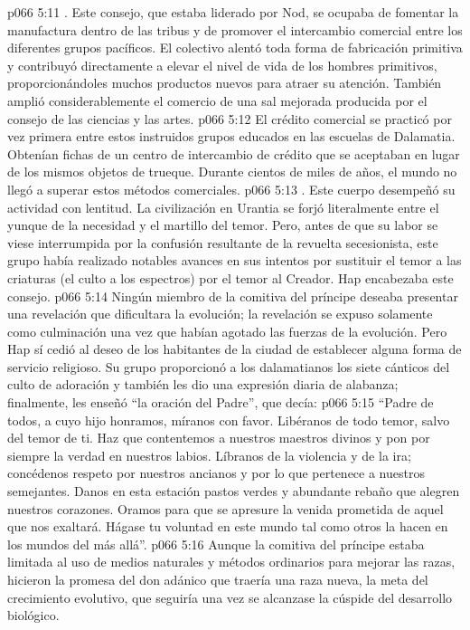 \vs p066 5:11 . Este consejo, que estaba liderado por Nod, se ocupaba de fomentar la manufactura dentro de las tribus y de promover el intercambio comercial entre los diferentes grupos pacíficos. El colectivo alentó toda forma de fabricación primitiva y contribuyó directamente a elevar el nivel de vida de los hombres primitivos, proporcionándoles muchos productos nuevos para atraer su atención. También amplió considerablemente el comercio de una sal mejorada producida por el consejo de las ciencias y las artes.
\vs p066 5:12 El crédito comercial se practicó por vez primera entre estos instruidos grupos educados en las escuelas de Dalamatia. Obtenían fichas de un centro de intercambio de crédito que se aceptaban en lugar de los mismos objetos de trueque. Durante cientos de miles de años, el mundo no llegó a superar estos métodos comerciales.
\vs p066 5:13 \pc {}. Este cuerpo desempeñó su actividad con lentitud. La civilización en Urantia se forjó literalmente entre el yunque de la necesidad y el martillo del temor. Pero, antes de que su labor se viese interrumpida por la confusión resultante de la revuelta secesionista, este grupo había realizado notables avances en sus intentos por sustituir el temor a las criaturas (el culto a los espectros) por el temor al Creador. Hap encabezaba este consejo.
\vs p066 5:14 Ningún miembro de la comitiva del príncipe deseaba presentar una revelación que dificultara la evolución; la revelación se expuso solamente como culminación una vez que habían agotado las fuerzas de la evolución. Pero Hap sí cedió al deseo de los habitantes de la ciudad de establecer alguna forma de servicio religioso. Su grupo proporcionó a los dalamatianos los siete cánticos del culto de adoración y también les dio una expresión diaria de alabanza; finalmente, les enseñó “la oración del Padre”, que decía:
\vs p066 5:15 \pc “Padre de todos, a cuyo hijo honramos, míranos con favor. Libéranos de todo temor, salvo del temor de ti. Haz que contentemos a nuestros maestros divinos y pon por siempre la verdad en nuestros labios. Líbranos de la violencia y de la ira; concédenos respeto por nuestros ancianos y por lo que pertenece a nuestros semejantes. Danos en esta estación pastos verdes y abundante rebaño que alegren nuestros corazones. Oramos para que se apresure la venida prometida de aquel que nos exaltará. Hágase tu voluntad en este mundo tal como otros la hacen en los mundos del más allá”.
\vs p066 5:16 \pc Aunque la comitiva del príncipe estaba limitada al uso de medios naturales y métodos ordinarios para mejorar las razas, hicieron la promesa del don adánico que traería una raza nueva, la meta del crecimiento evolutivo, que seguiría una vez se alcanzase la cúspide del desarrollo biológico.
